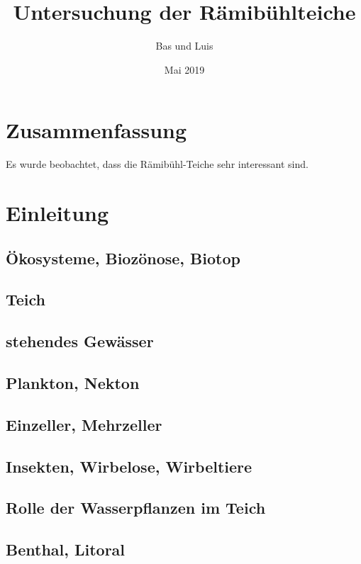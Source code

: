 \documentclass{article}
\title{Untersuchung der Rämibühlteiche}
\author{Bas und Luis}
\date{Mai 2019}
\begin{document}
\maketitle

\section{Zusammenfassung}
Es wurde beobachtet, dass die Rämibühl-Teiche sehr interessant sind.

\section{Einleitung}

\subsection{Ökosysteme, Biozönose, Biotop}

\subsection{Teich}

\subsection{stehendes Gewässer}

\subsection{Plankton, Nekton}

\subsection{Einzeller, Mehrzeller}

\subsection{Insekten, Wirbelose, Wirbeltiere}

\subsection{Rolle der Wasserpflanzen im Teich}

\subsection{Benthal, Litoral}
\end{document}
